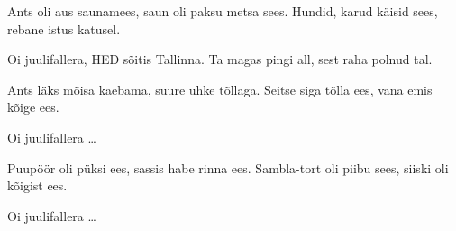 Ants oli aus saunamees, saun oli paksu metsa sees.
Hundid, karud k\"aisid sees, rebane istus katusel.

Oi juulifallera, HED s\~oitis Tallinna.
Ta magas pingi all, sest raha polnud tal.

Ants l\"aks m\~oisa kaebama, suure uhke t\~ollaga.
Seitse siga t\~olla ees, vana emis k\~oige ees.

Oi juulifallera \ldots

Puup\"o\"or oli p\"uksi ees, sassis habe rinna ees.
Sambla-tort oli piibu sees, siiski oli k\~oigist ees.

Oi juulifallera \ldots